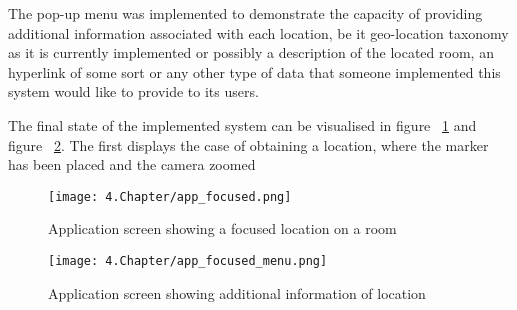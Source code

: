 The pop-up menu was implemented to demonstrate the capacity of providing additional information associated with each location, be it geo-location taxonomy as it is currently implemented or possibly a description of the located room, an hyperlink of some sort or any other type of data that someone implemented this system would like to provide to its users.  

The final state of the implemented system can be visualised in figure ~\ref{fig:AppFocus} and figure ~\ref{fig:AppMenu}. The first displays the case of obtaining a location, where the marker has been placed and the camera zoomed

\begin{figure}
	\centering
		\texttt{[image: 4.Chapter/app\_focused.png]}
	\caption[Application screen showing a focused location on a room]{Application screen showing a focused location on a room}
	\label{fig:AppFocus}
\end{figure}

\begin{figure}
	\centering
		\texttt{[image: 4.Chapter/app\_focused\_menu.png]}
	\caption[Application screen showing additional information of location]{Application screen showing additional information of location}
	\label{fig:AppMenu}
\end{figure}


